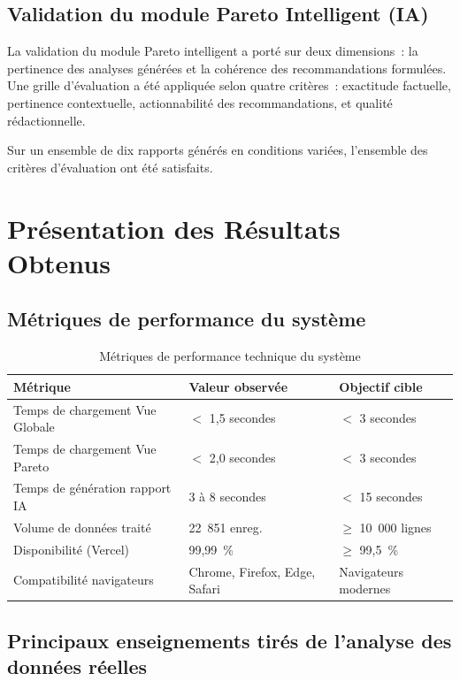 \documentclass[11pt,a4paper]{report}
\begin{document}
\subsection{Validation du module Pareto Intelligent (IA)}

La validation du module Pareto intelligent a porté sur deux dimensions~: la pertinence des analyses générées et la cohérence des recommandations formulées. Une grille d'évaluation a été appliquée selon quatre critères~: exactitude factuelle, pertinence contextuelle, actionnabilité des recommandations, et qualité rédactionnelle.

Sur un ensemble de dix rapports générés en conditions variées, l'ensemble des critères d'évaluation ont été satisfaits.

\section{Présentation des Résultats Obtenus}

\subsection{Métriques de performance du système}

\begin{table}[h!]
\centering
\caption{Métriques de performance technique du système}
\begin{tabularx}{\textwidth}{L{5.5cm} L{4cm} L{4cm}}
\toprule
\textbf{Métrique} & \textbf{Valeur observée} & \textbf{Objectif cible} \\
\midrule
Temps de chargement Vue Globale   & $<$ 1,5 secondes  & $<$ 3 secondes \\
Temps de chargement Vue Pareto    & $<$ 2,0 secondes  & $<$ 3 secondes \\
Temps de génération rapport IA    & 3 à 8 secondes    & $<$ 15 secondes \\
Volume de données traité          & 22~851 enreg.     & $\geq$ 10~000 lignes \\
Disponibilité (Vercel)            & 99,99~\%          & $\geq$ 99,5~\% \\
Compatibilité navigateurs         & Chrome, Firefox, Edge, Safari & Navigateurs modernes \\
\bottomrule
\end{tabularx}
\label{tab:perf}
\end{table}

\subsection{Principaux enseignements tirés de l'analyse des données réelles}
\end{document}
